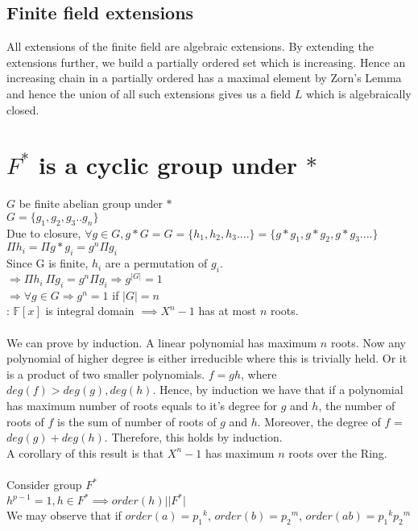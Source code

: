 \documentclass{article}
\begin{document}
\subsection{Finite field extensions}
All extensions of the finite field are algebraic extensions. By extending the extensions further, we build a partially ordered set which is increasing. Hence an increasing chain in a partially ordered has a maximal element by Zorn's Lemma and hence the union of all such extensions gives us a field $L$ which is algebraically closed. \\
\section{$F^*$ is a cyclic group under $*$}
$G$ be finite abelian group under $*$
\\ $G = \{g_1,g_2,g_3 .. g_n\}$
\\ Due to closure, $\forall g \in G, g*G = G = \{h_1,h_2,h_3 ....\} = \{g*g_1,g*g_2,g*g_3....\}$
\\ $\Pi h_i = \Pi g*g_i = g^n \Pi g_i$
\\ Since G is finite, $h_i$ are a permutation of $g_i$.
\\ $\Rightarrow \Pi h_i \ \Pi g_i = g^n \Pi g_i \Rightarrow g^{|G|} = 1$
\\ $\Rightarrow \forall g \in G \Rightarrow g^n = 1$ if $ |G| = n$ 
\\ : $\mathbb{F}[x]$ is integral domain $\implies X^n - 1$ has at most $n$ roots.
\\ 
\\ We can prove by induction.  A linear polynomial has maximum $n$ roots. Now any polynomial of higher degree is either irreducible where this is trivially held. Or it is a product of two smaller polynomials. 
$f = gh$, where $deg(f) > deg(g), deg(h)$. Hence, by induction we have that if a polynomial has maximum number of roots equals to it's degree for $g$ and $h$, the number of roots of $f$ is the sum of number of roots of $g$ and $h$. Moreover, the degree of $f$ = $deg(g) + deg(h)$. Therefore, this holds by induction. 
\\ A corollary of this result is that $X^n - 1$ has maximum $n$ roots over the Ring. 
\\
\\Consider group $F^*$
\\$h^{p-1} = 1,h  \in F^* \implies order(h) | |F^*|$
\\We may observe that if $order(a) = {p_1}^k$, $order(b) = {p_2}^m$, $order(ab) = {p_1}^k{p_2}^m$
\end{document}

